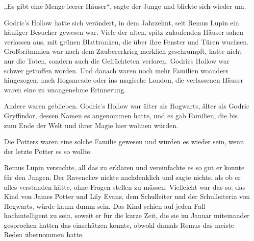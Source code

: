 „Es gibt eine Menge leerer Häuser“, sagte der Junge und blickte sich wieder um.

Godric’s Hollow hatte sich verändert, in dem Jahrzehnt, seit Remus Lupin ein häufiger Besucher gewesen war. Viele der alten, spitz zulaufenden Häuser sahen verlassen aus, mit grünen Blattranken, die über ihre Fenster und Türen wuchsen. Großbritannien war nach dem Zaubererkrieg merklich geschrumpft, hatte nicht nur die Toten, sondern auch die Geflüchteten verloren. Godrics Hollow war schwer getroffen worden. Und danach waren noch mehr Familien woanders hingezogen, nach Hogsmeade oder ins magische London, die verlassenen Häuser waren eine zu unangenehme Erinnerung.

Andere waren geblieben. Godric’s Hollow war älter als Hogwarts, älter als Godric Gryffindor, dessen Namen es angenommen hatte, und es gab Familien, die bis zum Ende der Welt und ihrer Magie hier wohnen würden.

Die Potters waren eine solche Familie gewesen und würden es wieder sein, wenn der letzte Potter es so wollte.

Remus Lupin versuchte, all das zu erklären und vereinfachte es so gut er konnte für den Jungen.
Der Ravenclaw nickte nachdenklich und sagte nichts, als ob er alles verstanden hätte, ohne Fragen stellen zu müssen. Vielleicht war das so; das Kind von James Potter und Lily Evans, dem Schulleiter und der Schulleiterin von Hogwarts, würde kaum dumm sein. Das Kind schien auf jeden Fall hochintelligent zu sein, soweit er für die kurze Zeit, die sie im Januar miteinander gesprochen hatten das einschätzen konnte, obwohl damals Remus das meiste Reden übernommen hatte.

